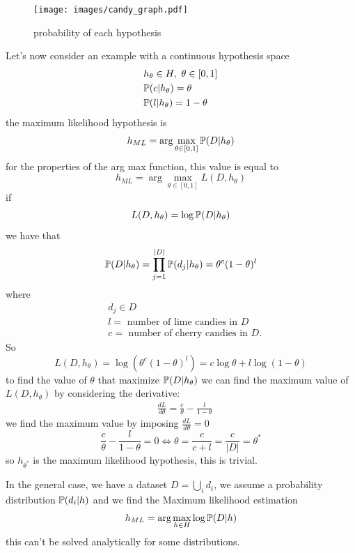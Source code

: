 \documentclass[10pt, letterpaper]{report}
\begin{document}
\begin{figure}[h!]
	\centering
	\texttt{[image: images/candy\_graph.pdf]}
	\caption{probability of each hypothesis}
	\label{img:candy_graph}
\end{figure}
\noindent
Let's now consider an example with a continuous hypothesis space\begin{align}
	 & h_\theta\in H, \ \theta\in[0,1] \\
	 & {\mathbb P}(c|h_\theta)=\theta        \\
	 & {\mathbb P}(l|h_\theta)=1-\theta
\end{align}
the maximum likelihood hypothesis is\begin{equation}
	h_{ML}=\arg\max_{\theta\in[0,1]}{\mathbb P}(D|h_\theta)
\end{equation}
for the properties of the arg max function, this value is equal to
\begin{equation}
	h_{ML}=\arg\max_{\theta\in[0,1]}L(D,h_\theta)
\end{equation}
if \begin{equation}
	L(D,h_\theta)=\log{\mathbb P}(D|h_\theta)
\end{equation}
we have that\begin{equation}
	{\mathbb P}(D|h_{\theta})=\prod_{j=1}^{|D|}{\mathbb P}(d_j|h_\theta)=\theta^c(1-\theta)^l
\end{equation}
where\begin{align*}
	 & d_j\in D                                   \\
	 & l = \text{ number of lime candies in }D    \\
	 & c = \text{ number of cherry candies in }D.
\end{align*}
So\begin{equation}
	L(D,h_\theta)=\log(\theta^c(1-\theta)^l)=c\log\theta+l\log(1-\theta)
\end{equation}
to find the value of $\theta$ that maximize ${\mathbb P}(D|h_\theta)$ we can find the maximum value of $ L(D,h_\theta)$ by considering the derivative:\begin{align*}
	 & \frac{dL}{d\theta}=\frac{c}{\theta}-\frac{l}{1-\theta}
\end{align*}
we find the maximum value by imposing $\frac{dL}{d\theta}=0$\begin{equation}
	\frac{c}{\theta}-\frac{l}{1-\theta}=0\iff \theta=\frac{c}{c+l}=\frac{c}{|D|}=\theta^*
\end{equation}
so $h_{\theta^*}$ is the maximum likelihood hypothesis, this is trivial.\bigskip

In the general case, we have a dataset $D=\bigcup_i d_i$, we assume a probability distribution ${\mathbb P}(d_i|h)$ and we find the Maximum likelihood estimation\begin{equation}
	h_{ML}=\arg\max_{h\in H}\log{\mathbb P}(D|h)
\end{equation}
this can't be solved analytically for some distributions.
\end{document}
